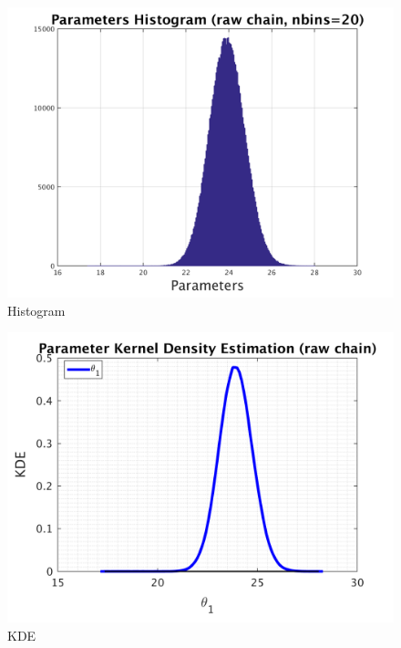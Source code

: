 \begin{figure}[H]
  
  \centering
   \includegraphics[scale=0.75]{100_results/outputData_700000/simple_ip_hist_raw}
   \caption{Histogram}
\end{figure}



\begin{figure}[H]
  
  \centering
   \includegraphics[scale=0.75]{100_results/outputData_700000/simple_ip_kde_raw}
   \caption{ KDE }
\end{figure}

